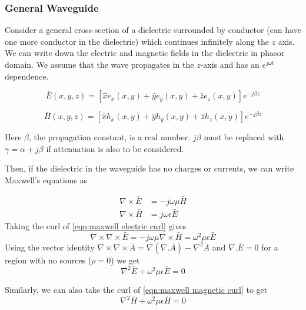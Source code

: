 \subsubsection{General Waveguide}

Consider a general cross-section of a dielectric surrounded by conductor (can have one more conductor in the dielectric) which continues infinitely along the $z$ axis. We can write down the electric and magnetic fields in the dielectric in phasor domain. We assume that the wave propagates in the $z$-axis and has an $e^{j\omega t}$ dependence.

\begin{equation}
\bar{E}(x,y,z)=[\hat{x}e_x(x,y)+\hat{y}e_y(x,y)+\hat{z}e_z(x,y)]e^{-j\beta z}
\label{eqn:electric field general}
\end{equation}

\begin{equation}
\bar{H}(x,y,z)=[\hat{x}h_x(x,y)+\hat{y}h_y(x,y)+\hat{z}h_z(x,y)]e^{-j\beta z}
\label{eqn:magnetic field general}
\end{equation}

Here $\beta$, the propagation constant, is a real number. $j\beta$ must be replaced with $\gamma=\alpha+j\beta$ if attenuation is also to be considered.

Then, if the dielectric in the waveguide has no charges or currents, we can write Maxwell's equations as

\begin{subequations}
\label{eqn:maxwell curl}
\begin{align}
\nabla \times \bar{E}& =-j\omega \mu \bar{H}
\label{eqn:maxwell electric curl}\\
\nabla \times \bar{H}& =j\omega \epsilon \bar{E}
\label{eqn:maxwell magnetic curl}
\end{align}
\end{subequations}
Taking the curl of \ref{eqn:maxwell electric curl} gives
\begin{equation}
\nabla \times \nabla \times \bar{E}=-j\omega\mu \nabla \times \bar{H}=\omega^2 \mu\epsilon \bar{E}
\end{equation}
Using the vector identity $\nabla\times\nabla\times\bar{A}=\nabla(\nabla .\bar{A})-\nabla^2 \bar{A}$ and $\nabla .\bar{E}=0$ for a region with no sources ($\rho=0$) we get
\begin{equation}
\nabla^2 \bar{E}+\omega^2\mu\epsilon\bar{E}=0
\end{equation}

Similarly, we can also take the curl of \ref{eqn:maxwell magnetic curl} to get
\begin{equation}
\nabla^2 \bar{H}+\omega^2\mu\epsilon\bar{H}=0
\end{equation}


